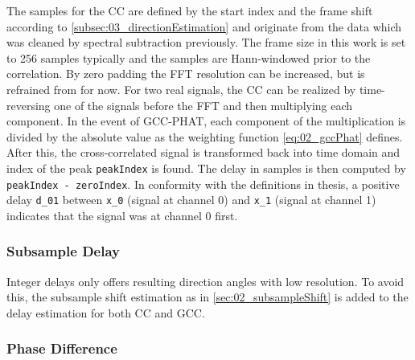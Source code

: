 The samples for the \ac{CC} are defined by the start index and the frame shift
according to \cref{subsec:03_directionEstimation} and originate from the data which was
cleaned by spectral subtraction previously.
The frame size in this work is set to 256 samples typically and the samples are Hann-windowed
prior to the correlation.
By zero padding the \ac{FFT} resolution can be increased, but is refrained from for now.
For two real signals, the \ac{CC} can be realized by time-reversing one of the signals before
the \ac{FFT} and then multiplying each component.
In the event of \ac{GCC-PHAT}, each component of the multiplication is divided by the absolute
value as the weighting function \cref{eq:02_gccPhat} defines.
After this, the cross-correlated signal is transformed back into time domain and
index of the peak \lstinline!peakIndex! is found.
The delay in samples is then computed by \lstinline!peakIndex - zeroIndex!.
In conformity with the definitions in thesis, a positive delay \lstinline!d_01!
between \lstinline!x_0! (signal at channel 0) and \lstinline!x_1! (signal at channel 1)
indicates that the signal was at channel 0 first.

\subsubsection*{Subsample Delay}
\label{subsubsec:03_subsample}

Integer delays only offers resulting direction angles with low resolution.
To avoid this, the subsample shift estimation as in \cref{sec:02_subsampleShift}
is added to the delay estimation for both \ac{CC} and \ac{GCC}.

\subsubsection{Phase Difference}
\label{subsubsec:03_phase}


